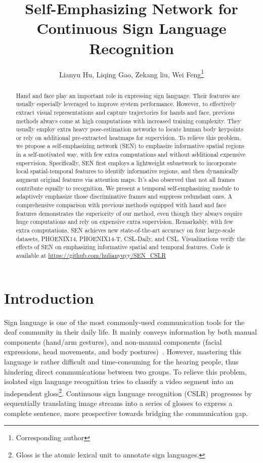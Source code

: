 \documentclass[letterpaper]{article} \usepackage{aaai23}  \usepackage{times}  \usepackage{helvet}  \usepackage{courier}  \usepackage[hyphens]{url}  \usepackage{graphicx} \urlstyle{rm} \def\UrlFont{\rm}  \usepackage{natbib}  \usepackage{caption} \frenchspacing  \setlength{\pdfpagewidth}{8.5in} \setlength{\pdfpageheight}{11in} \usepackage{algorithm}
\title{Self-Emphasizing Network for Continuous Sign Language Recognition }
\author{
Lianyu Hu, Liqing Gao, Zekang liu, Wei Feng\thanks{Corresponding author}
}
\begin{document}
\maketitle

\begin{abstract}
Hand and face play an important role in expressing sign language. Their features are usually especially leveraged to improve system performance. However, to effectively extract visual representations and capture trajectories for hands and face, previous methods always come at high computations with increased training complexity. They usually employ extra heavy pose-estimation networks to locate human body keypoints or rely on additional pre-extracted heatmaps for supervision. To relieve this problem, we propose a self-emphasizing network (SEN) to emphasize informative spatial regions in a self-motivated way, with few extra computations and without additional expensive supervision. Specifically, SEN first employs a lightweight subnetwork to incorporate local spatial-temporal features to identify informative regions, and then dynamically augment original features via attention maps. It's also observed that not all frames contribute equally to recognition. We present a temporal self-emphasizing module to adaptively emphasize those discriminative frames and suppress redundant ones. A comprehensive comparison with previous methods equipped with hand and face features demonstrates the superiority of our method, even though they always require huge computations and rely on expensive extra supervision. Remarkably, with few extra computations, SEN achieves new state-of-the-art accuracy on four large-scale datasets, PHOENIX14, PHOENIX14-T, CSL-Daily, and CSL. Visualizations verify the effects of SEN on emphasizing informative spatial and temporal features. Code is available at \url{https://github.com/hulianyuyy/SEN_CSLR}
\end{abstract}

\section{Introduction}
Sign language is one of the most commonly-used communication tools for the deaf community in their daily life. It mainly conveys information by both manual components (hand/arm gestures), and non-manual components (facial expressions, head movements, and body postures)~\cite{dreuw2007speech,ong2005automatic}. However, mastering this language is rather difficult and time-consuming for the hearing people, thus hindering direct communications between two groups. To relieve this problem, isolated sign language recognition tries to classify a video segment into an independent gloss\footnote{Gloss is the atomic lexical unit to annotate sign languages.}. Continuous sign language recognition (CSLR) progresses by sequentially translating image streams into a series of glosses to express a complete sentence, more prospective towards bridging the communication gap. 
\end{document}
